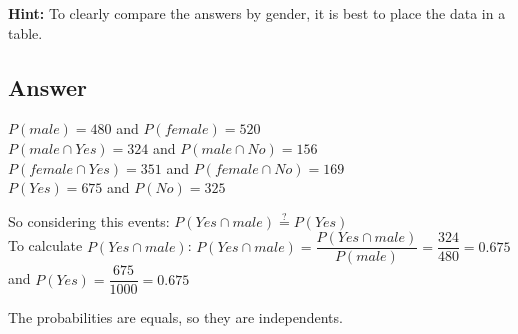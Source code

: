 \documentclass[a4paper]{article} %
\begin{document}
\textbf{Hint:} To clearly compare the answers by gender, it is best to place the data in a table.

\subsection*{Answer}
$P(male) = 480$ and $P(female) = 520$ \\
$P(male \cap Yes) = 324$ and $P(male \cap No) = 156$ \\
$P(female \cap Yes) = 351$ and $P(female \cap No) = 169$ \\
$P(Yes) = 675$ and $P(No) = 325$

So considering this events:
$P(Yes \cap male) \stackrel{?}{=} P(Yes)$\\
To calculate $P(Yes \cap male)$:
$P(Yes \cap male) = \dfrac{P(Yes \cap male)}{P(male)} = \dfrac{324}{480} = 0.675$ \\
and $P(Yes) = \dfrac{675}{1000} = 0.675$

The probabilities are equals, so they are independents.
\end{document}
